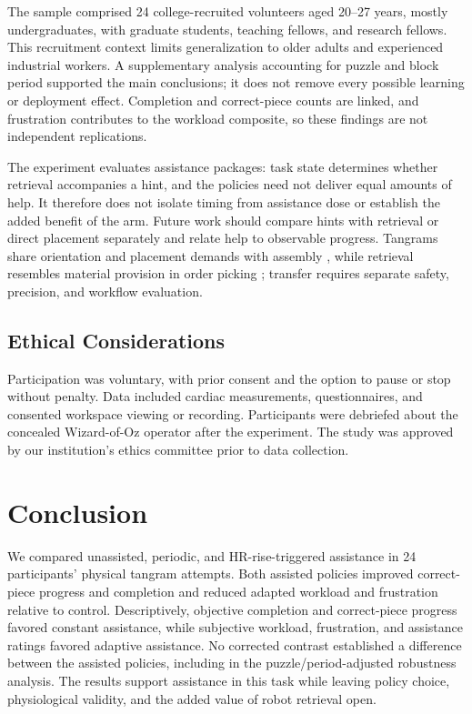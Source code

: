 \documentclass[sigconf,anonymous]{aamas}
\begin{document}
The sample comprised 24 college-recruited volunteers aged 20--27 years, mostly undergraduates, with graduate students, teaching fellows, and research fellows. This recruitment context limits generalization to older adults and experienced industrial workers. A supplementary analysis accounting for puzzle and block period supported the main conclusions; it does not remove every possible learning or deployment effect. Completion and correct-piece counts are linked, and frustration contributes to the workload composite, so these findings are not independent replications.

The experiment evaluates assistance packages: task state determines whether retrieval accompanies a hint, and the policies need not deliver equal amounts of help. It therefore does not isolate timing from assistance dose or establish the added benefit of the arm. Future work should compare hints with retrieval or direct placement separately and relate help to observable progress. Tangrams share orientation and placement demands with assembly \cite{zhao2025}, while retrieval resembles material provision in order picking \cite{smit2024}; transfer requires separate safety, precision, and workflow evaluation.

\subsection{Ethical Considerations}

Participation was voluntary, with prior consent and the option to pause or stop without penalty. Data included cardiac measurements, questionnaires, and consented workspace viewing or recording. Participants were debriefed about the concealed Wizard-of-Oz operator after the experiment. The study was approved by our institution’s ethics committee prior to data collection.

\section{Conclusion}

We compared unassisted, periodic, and HR-rise-triggered assistance in 24 participants' physical tangram attempts. Both assisted policies improved correct-piece progress and completion and reduced adapted workload and frustration relative to control. Descriptively, objective completion and correct-piece progress favored constant assistance, while subjective workload, frustration, and assistance ratings favored adaptive assistance. No corrected contrast established a difference between the assisted policies, including in the puzzle/period-adjusted robustness analysis. The results support assistance in this task while leaving policy choice, physiological validity, and the added value of robot retrieval open.
\end{document}
